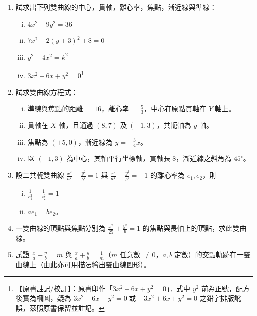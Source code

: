 \begin{enumerate}
  \item 試求出下列雙曲線的中心，貫軸，離心率，焦點，漸近線與準線：
  \begin{enumerate}[(i)]
    \item $4x^2 - 9y^2 = 36$
    \item $7x^2 - 2(y+3)^2 + 8 = 0$
    \item $y^2 - 4x^2 = k^2$
    \item $3x^2 - 6x + y^2 = 0$\label{note:b4-ch3-ex2-1-4}\footnote{【原書註記/校訂】：原書印作「$3x^2 - 6x + y^2 = 0$」，式中 $y^2$ 前為正號，配方後實為橢圓，疑為 $3x^2 - 6x - y^2 = 0$ 或 $-3x^2 + 6x + y^2 = 0$ 之鉛字排版訛誤，茲照原書保留並註記。}
  \end{enumerate}

  \item 試求雙曲線方程式：
  \begin{enumerate}[(i)]
    \item 準線與焦點的距離 $= 16$，離心率 $= \frac{5}{3}$，中心在原點貫軸在 $Y$ 軸上。
    \item[*(\roman{enumii})] 貫軸在 $X$ 軸，且通過 $(8,7)$ 及 $(-1,3)$，共軛軸為 $y$ 軸。
    \item 焦點為 $(\pm 5, 0)$，漸近線為 $y = \pm \frac{3}{4}x$。
    \item[*(\roman{enumii})] 以 $(-1,3)$ 為中心，其軸平行坐標軸，貫軸長 8，漸近線之斜角為 $45^\circ$。
  \end{enumerate}

  \item 設二共軛雙曲線 $\frac{x^2}{a^2} - \frac{y^2}{b^2} = 1$ 與 $\frac{x^2}{a^2} - \frac{y^2}{b^2} = -1$ 的離心率為 $e_1, e_2$，則
  \begin{enumerate}[(i)]
    \item $\frac{1}{e_1^2} + \frac{1}{e_2^2} = 1$
    \item $a e_1 = b e_2$。
  \end{enumerate}

  \item 一雙曲線的頂點與焦點分別為 $\frac{x^2}{25} + \frac{y^2}{9} = 1$ 的焦點與長軸上的頂點，求此雙曲線。

  \item[*\theenumi.] 試證 $\frac{x}{a} - \frac{y}{b} = m$ 與 $\frac{x}{a} + \frac{y}{b} = \frac{1}{m}$（$m$ 任意數 $\neq 0$，$a, b$ 定數）的交點軌跡在一雙曲線上（由此亦可用描法繪出雙曲線圖形）。
\end{enumerate}

